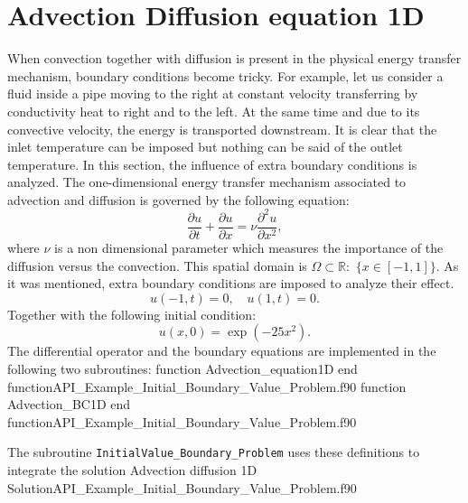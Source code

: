 \section{Advection Diffusion equation 1D}
When convection together with diffusion is present in the physical energy transfer mechanism, boundary conditions become tricky. 
For example, let us consider a fluid inside a pipe moving to the right at constant velocity transferring by conductivity heat to right and to the left. At the same time and due to its convective velocity, the energy is transported downstream. It is clear that the inlet temperature can be imposed but nothing can be said of the outlet temperature.  
In this section, the influence of extra boundary conditions is analyzed. 
The one-dimensional energy transfer mechanism associated to advection and diffusion is governed by the following equation: 
       \begin{equation*}      	
       \frac{\partial u}{\partial t} +  \frac{\partial u}{\partial x} = \nu \frac{\partial^2 u}{\partial x^2},
       \end{equation*}
where $ \nu $ is a non dimensional parameter which measures the importance of the diffusion versus the convection.      
This spatial domain is $\Omega \subset \mathbb{R} : $ $\{x\in  [-1,1]\}$.   
As it was mentioned, extra boundary conditions are imposed to analyze their effect. 
       \begin{equation*}      	
       u(-1,t)=0, \quad u(1,t)=0.
       \end{equation*}
Together with the following initial condition:
       \begin{equation*}      	
       u(x,0)=\exp(-25 x^2).
       \end{equation*}
The differential operator and the boundary equations are implemented in the following two subroutines: 
\vspace{0.2cm} 
       {function Advection_equation1D}
       {end function}{API_Example_Initial_Boundary_Value_Problem.f90}
\vspace{0.2cm} 
       {function Advection_BC1D}
       {end function}{API_Example_Initial_Boundary_Value_Problem.f90}
       
      
The subroutine \verb|InitialValue_Boundary_Problem| uses these definitions to integrate the solution     
       \vspace{0.5cm} 
       {Advection diffusion 1D}
       {Solution}{API_Example_Initial_Boundary_Value_Problem.f90}
 
